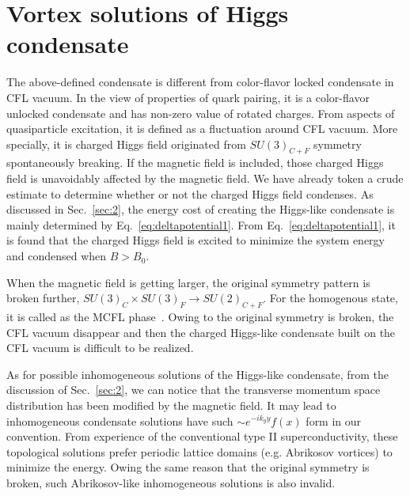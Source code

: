 \documentclass[12pt]{article}
\begin{document}
\section{\bf Vortex solutions of Higgs condensate}
\label{sec:3}
\vspace{0.2cm}

The above-defined condensate is different from color-flavor
locked condensate in CFL vacuum.
In the view of properties of quark pairing, it is a color-flavor unlocked condensate
and has non-zero value of rotated charges.
From aspects of quasiparticle excitation, it is
defined as a fluctuation around CFL vacuum.
More specially, it is charged Higgs field originated from $SU(3)_{C+F}$
 symmetry spontaneously breaking.
If the magnetic field is included,
those charged Higgs field is unavoidably affected by the magnetic field.
We  have already token a crude estimate to determine whether or not the 
charged Higgs field condenses.
As discussed in Sec.~\ref{sec:2}, the energy cost of creating the Higgs-like condensate
is mainly determined by Eq.~\eqref{eq:deltapotential1}.
From Eq.~\eqref{eq:deltapotential1}, 
it is found that the charged Higgs field is excited 
to minimize the system energy
and condensed when $B >B_0$.


When the magnetic field is getting larger, the original
symmetry pattern is broken further, $SU(3)_C \times SU(3)_F \rightarrow SU(2)_{C+F}$.
For the homogenous state, it is called as the MCFL
phase~\cite{ferrer2005magnetic,ferrer2006magnetic}. 
Owing to the original symmetry is broken,
the CFL vacuum  disappear and then the charged  Higgs-like condensate 
built on the CFL vacuum  is difficult to be realized.



As for possible inhomogeneous solutions of the
Higgs-like condensate,
from the discussion of Sec.~\ref{sec:2}, we can notice that the
transverse momentum space distribution has been modified by 
the magnetic field.
It may lead to  inhomogeneous condensate solutions 
have such $\sim e^{-ik_y y}f(x)$ form in our convention.
From experience of the conventional type II superconductivity,
these topological solutions
prefer periodic lattice domains (e.g. Abrikosov vortices) to minimize the energy.
Owing the same reason that 
the original symmetry is broken, such Abrikosov-like inhomogeneous solutions
is also invalid.




  
\end{document}
